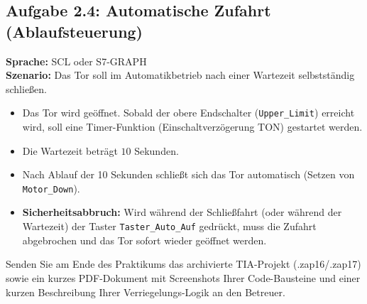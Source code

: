 \documentclass[11pt,a4paper]{article}
\begin{document}
\subsection{Aufgabe 2.4: Automatische Zufahrt (Ablaufsteuerung)}
\textbf{Sprache:} SCL oder S7-GRAPH \\
\textbf{Szenario:} Das Tor soll im Automatikbetrieb nach einer Wartezeit selbstständig schließen.
\begin{itemize}
    \item Das Tor wird geöffnet. Sobald der obere Endschalter (\texttt{Upper\_Limit}) erreicht wird, soll eine Timer-Funktion (Einschaltverzögerung TON) gestartet werden.
    \item Die Wartezeit beträgt $10$ Sekunden.
    \item Nach Ablauf der 10 Sekunden schließt sich das Tor automatisch (Setzen von \texttt{Motor\_Down}).
    \item \textbf{Sicherheitsabbruch:} Wird während der Schließfahrt (oder während der Wartezeit) der Taster \texttt{Taster\_Auto\_Auf} gedrückt, muss die Zufahrt abgebrochen und das Tor sofort wieder geöffnet werden.
\end{itemize}

\vspace{1cm}
\begin{tcolorbox}[colback=siemensblue!10, colframe=siemensblue, title=\textbf{Abgabe}]
Senden Sie am Ende des Praktikums das archivierte TIA-Projekt (.zap16/.zap17) sowie ein kurzes PDF-Dokument mit Screenshots Ihrer Code-Bausteine und einer kurzen Beschreibung Ihrer Verriegelungs-Logik an den Betreuer.
\end{tcolorbox}
\end{document}
